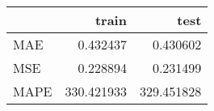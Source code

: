 \begin{tabular}{lrr}
\toprule
{} &       train &        test \\
\midrule
MAE  &    0.432437 &    0.430602 \\
MSE  &    0.228894 &    0.231499 \\
MAPE &  330.421933 &  329.451828 \\
\bottomrule
\end{tabular}
